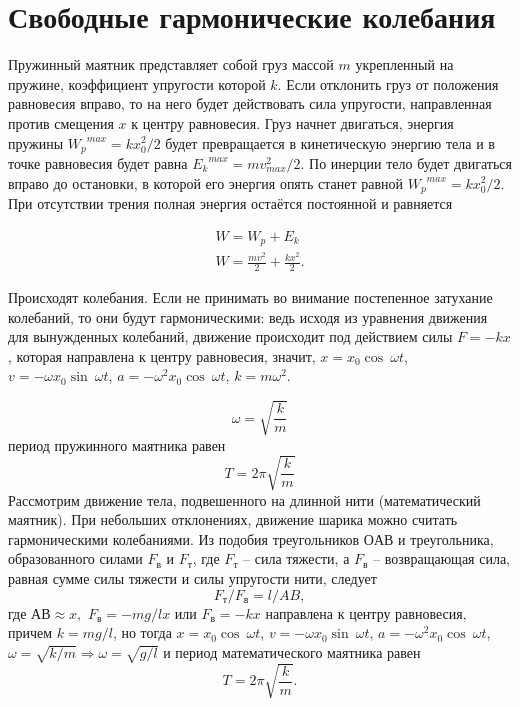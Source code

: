 \documentclass[a5paper, 10pt]{diss_4}
\renewcommand{\'}{\,'}
\begin{document}
\section{Свободные гармонические колебания}
Пружинный маятник представляет собой груз массой $m$ укрепленный на пружине, коэффициент
упругости которой $k$. Если отклонить груз от положения равновесия вправо, то на него
будет действовать сила упругости, направленная против смещения $x$ к центру равновесия.
Груз начнет двигаться, энергия пружины ${W_p}^{max}=kx_0^2/2$ будет превращается в
кинетическую энергию тела и в точке равновесия будет равна ${E_k}^{max}=mv^2_{max}/2$. По
инерции тело будет двигаться вправо до остановки, в которой его энергия  опять станет
равной ${W_p}^{max}=kx_0^2/2$.  При отсутствии трения полная энергия остаётся постоянной
и равняется

\begin{gather*}
W={W_p+E_k}\\
W=\frac{mv^2}{2}+\frac{kx^2}{2}.
\end{gather*}

Происходят колебания. Если не принимать во внимание постепенное затухание колебаний, то
они будут гармоническими: ведь исходя из уравнения движения для вынужденных колебаний,
движение происходит под действием силы $F=-kx$, которая направлена к центру равновесия,
значит, $x=x_0\cos\ \omega t$, $v = -\omega x_0 \sin\ \omega t$, $a= -\omega^2 x_0 \cos\
\omega t$, $k=m\omega^2$.

\[
\omega=\sqrt{\frac{k}{m}}
\]
период пружинного маятника равен
\[
T=2\pi\sqrt{\frac{k}{m}}
\]
Рассмотрим движение тела, подвешенного на длинной  нити (математический маятник). При небольших отклонениях, движение шарика можно считать гармоническими колебаниями.   Из подобия треугольников $ОАВ$ и треугольника, образованного силами $F_в$ и  $F_т$, где  $F_т$ -- сила тяжести, а $F_в$ -- возвращающая сила, равная сумме силы тяжести и силы упругости нити, следует
\[
F_т/F_в=l/AB,
\]
где $АВ\approx x,$ $F_в = -{mg}/{l}x$ или $ F_в =-kx$  направлена к центру равновесия,
причем $k=mg/l$, но тогда $x=x_0\cos\ \omega t$, $v= -\omega x_0\sin\ \omega t$,  $a=
-\omega^2x_0\cos\ \omega t$, $\omega=\sqrt{{k}/{m}}\Rightarrow\omega=\sqrt{{g}/{l}}$ и
период математического маятника равен
\[
T=2\pi\sqrt{\frac{k}{m}}.
\]
\end{document}
